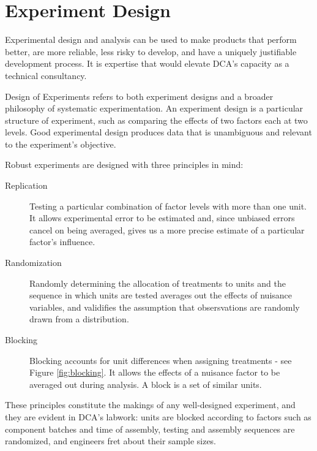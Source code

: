 \documentclass[11pt,a4paper,article]{memoir} %
\begin{document}
\section{Experiment Design}
Experimental design and analysis can be used to make products that perform better, are more reliable, less risky to develop, and have a uniquely justifiable development process. It is expertise that would elevate DCA's capacity as a technical consultancy.
\par
Design of Experiments refers to both experiment designs and a broader philosophy of systematic experimentation. An experiment design is a particular structure of experiment, such as comparing the effects of two factors each at two levels. Good experimental design produces data that is unambiguous and relevant to the experiment's objective.
\par
Robust experiments are designed with three principles in mind:
\begin{description}
\item[Replication]{Testing a particular combination of factor levels with more than one unit. It allows experimental error to be estimated and, since unbiased errors cancel on being averaged, gives us a more precise estimate of a particular factor's influence.}
\item[Randomization]{Randomly determining the allocation of treatments to units and the sequence in which units are tested averages out the effects of nuisance variables, and validifies the assumption that obsersvations are randomly drawn from a distribution.}
\item[Blocking]{Blocking accounts for unit differences when assigning treatments - see Figure \ref{fig:blocking}. It allows the effects of a nuisance factor to be averaged out during analysis. A block is a set of similar units.}
\end{description}
These principles constitute the makings of any well-designed experiment, and they are evident in DCA's labwork: units are blocked according to factors such as component batches and time of assembly, testing and assembly sequences are randomized, and engineers fret about their sample sizes. 
\end{document}
